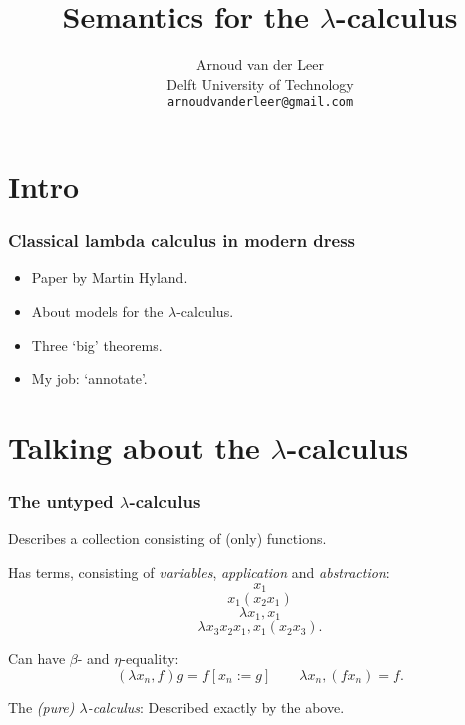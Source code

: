 \documentclass[aspectratio=169]{fancyslides} %
\title{Semantics for the \texorpdfstring{$ \lambda $}{lambda}-calculus}
\author{Arnoud van der Leer\\Delft University of Technology\\\texttt{arnoudvanderleer@gmail.com}}
\begin{document}
  \maketitle

  \section{Intro}

  \begin{frame}
    \frametitle{Classical lambda calculus in modern dress}

    \begin{itemize}
      \item Paper by Martin Hyland.
      \item About models for the $ \lambda $-calculus.
      \item Three `big' theorems.
      \item My job: `annotate'.
    \end{itemize}
  \end{frame}

  \frame{\tableofcontents}

  \section{Talking about the \texorpdfstring{$\lambda$}{lambda}-calculus}

  \frame{\tableofcontents[currentsection]}

  \begin{frame}
    \frametitle{The \textbf{untyped} $ \lambda $-calculus}

    Describes a collection consisting of (only) functions.

    \pause

    Has terms, consisting of \textit{variables}, \textit{application} and \textit{abstraction}:
    \[ x_1 \]
    \[ x_1 (x_2 x_1) \]
    \[ \lambda x_1, x_1 \]
    \[ \lambda x_3 x_2 x_1, x_1 (x_2 x_3). \]

    Can have $ \beta $- and $ \eta $-equality:
    \[ (\lambda x_n, f) g = f [x_n := g] \qquad \lambda x_n, (f x_n) = f.\]

    \pause

    The \textit{(pure) $ \lambda $-calculus}: Described exactly by the above.
  \end{frame}
\end{document}
